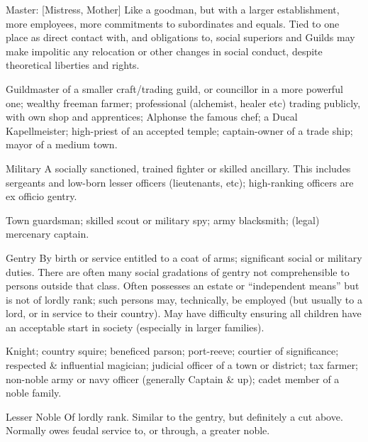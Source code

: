 \begin{multicols*}{3}
\begin{Description}
\item[Master: {[}Mistress, Mother{]}] Like a goodman, but with a
larger establishment, more employees, more commitments to subordinates
and equals.  Tied to one place as direct contact with, and obligations
to, social superiors and Guilds may make impolitic any relocation or
other changes in social conduct, despite theoretical liberties and
rights.

\begin{example}
Guildmaster of a smaller craft/trading guild, or councillor in a more
powerful one; wealthy freeman farmer; professional (alchemist, healer
etc) trading publicly, with own shop and apprentices; Alphonse the
famous chef; a Ducal Kapellmeister; high-priest of an accepted temple;
captain-owner of a trade ship; mayor of a medium town.
\end{example}

\item[Military] A socially sanctioned, trained fighter or skilled
ancillary. This includes sergeants and low-born lesser officers
(lieutenants, etc); high-ranking officers are ex officio gentry.

\begin{example}
Town guardsman; skilled scout or military spy; army blacksmith;
(legal) mercenary captain.
\end{example}

\item[Gentry] By birth or service entitled to a coat of arms;
significant social or military duties. There are often many social
gradations of gentry not comprehensible to persons outside that
class. Often possesses an estate or ``independent means'' but is not of
lordly rank; such persons may, technically, be employed (but usually
to a lord, or in service to their country). May have difficulty
ensuring all children have an acceptable start in society (especially
in larger families).

\begin{example}
Knight; country squire; beneficed parson; port-reeve; courtier of
significance; respected \& influential magician; judicial officer of a
town or district; tax farmer; non-noble army or navy officer
(generally Captain \& up); cadet member of a noble family.
\end{example}

\item[Lesser Noble] Of lordly rank. Similar to the gentry, but
definitely a cut above. Normally owes feudal service to, or through, a
greater noble.


\end{Description}
\end{multicols*}
